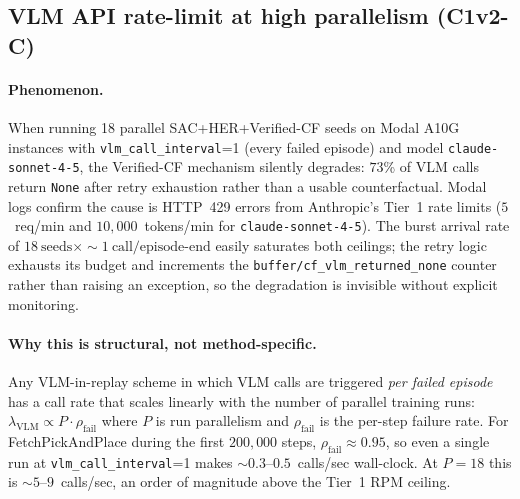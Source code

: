 \subsection{VLM API rate-limit at high parallelism (C1v2-C)}
\label{app:ratelimit}

\paragraph{Phenomenon.}
When running 18 parallel SAC+HER+Verified-CF seeds on Modal A10G
instances with \texttt{vlm\_call\_interval}=1 (every failed episode)
and model \texttt{claude-sonnet-4-5}, the Verified-CF mechanism
silently degrades: $73$\% of VLM calls return \texttt{None} after
retry exhaustion rather than a usable counterfactual.
Modal logs confirm the cause is HTTP~429 errors from Anthropic's
Tier~1 rate limits ($5$~req/min and $10{,}000$~tokens/min for
\texttt{claude-sonnet-4-5}).  The burst arrival rate of
$18~\text{seeds} \times \sim 1~\text{call/episode-end}$ easily
saturates both ceilings; the retry logic exhausts its budget
and increments the \texttt{buffer/cf\_vlm\_returned\_none} counter
rather than raising an exception, so the degradation is invisible
without explicit monitoring.

\paragraph{Why this is structural, not method-specific.}
Any VLM-in-replay scheme in which VLM calls are triggered
\emph{per failed episode} has a call rate that scales linearly
with the number of parallel training runs: $\lambda_{\text{VLM}}
\propto P \cdot \rho_{\text{fail}}$ where $P$ is run parallelism
and $\rho_{\text{fail}}$ is the per-step failure rate.  For
FetchPickAndPlace during the first $200{,}000$ steps,
$\rho_{\text{fail}} \approx 0.95$, so even a single run at
\texttt{vlm\_call\_interval}=1 makes $\sim 0.3$--$0.5$~calls/sec
wall-clock.  At $P=18$ this is $\sim 5$--$9$~calls/sec, an order
of magnitude above the Tier~1 RPM ceiling.

